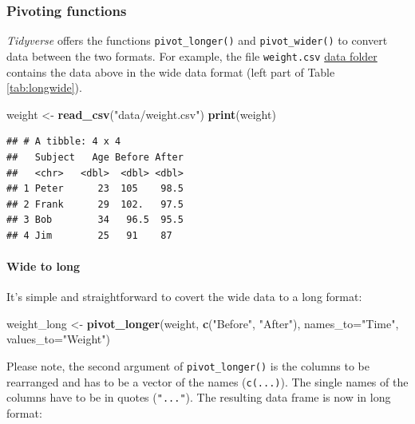 \documentclass[
]{scrartcl}
\newenvironment{Shaded}{\begin{snugshade}}{\end{snugshade}}
\newcommand{\AttributeTok}[1]{\textcolor[rgb]{0.13,0.29,0.53}{#1}}
\newcommand{\FunctionTok}[1]{\textcolor[rgb]{0.13,0.29,0.53}{\textbf{#1}}}
\newcommand{\NormalTok}[1]{#1}
\newcommand{\OtherTok}[1]{\textcolor[rgb]{0.56,0.35,0.01}{#1}}
\newcommand{\StringTok}[1]{\textcolor[rgb]{0.31,0.60,0.02}{#1}}
\begin{document}
\subsubsection{Pivoting functions}\label{pivoting-functions}

\emph{Tidyverse} offers the functions \texttt{pivot\_longer()} and \texttt{pivot\_wider()} to convert data between the two formats. For example, the file \texttt{weight.csv} \href{./data}{data folder} contains the data above in the wide data format (left part of Table \ref{tab:longwide}).

\begin{Shaded}
\begin{Highlighting}[]
\NormalTok{weight }\OtherTok{\textless{}{-}} \FunctionTok{read\_csv}\NormalTok{(}\StringTok{"data/weight.csv"}\NormalTok{)}
\FunctionTok{print}\NormalTok{(weight)}
\end{Highlighting}
\end{Shaded}

\begin{verbatim}
## # A tibble: 4 x 4
##   Subject   Age Before After
##   <chr>   <dbl>  <dbl> <dbl>
## 1 Peter      23  105    98.5
## 2 Frank      29  102.   97.5
## 3 Bob        34   96.5  95.5
## 4 Jim        25   91    87
\end{verbatim}

\paragraph*{Wide to long}\label{wide-to-long}

It's simple and straightforward to covert the wide data to a long format:

\begin{Shaded}
\begin{Highlighting}[]
\NormalTok{weight\_long }\OtherTok{\textless{}{-}} \FunctionTok{pivot\_longer}\NormalTok{(weight, }\FunctionTok{c}\NormalTok{(}\StringTok{"Before"}\NormalTok{, }\StringTok{"After"}\NormalTok{), }\AttributeTok{names\_to=}\StringTok{"Time"}\NormalTok{, }\AttributeTok{values\_to=}\StringTok{"Weight"}\NormalTok{)}
\end{Highlighting}
\end{Shaded}

Please note, the second argument of \texttt{pivot\_longer()} is the columns to be rearranged and has to be a vector of the names (\texttt{c(...)}). The single names of the columns have to be in quotes (\texttt{"..."}). The resulting data frame is now in long format:
\end{document}

